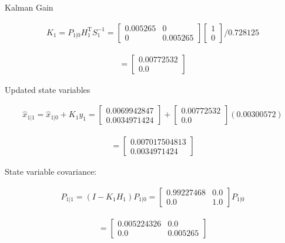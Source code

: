 Kalman Gain

\[\begin{aligned}
K_1 = P_{1|0}H_1^\text{T}S_1^{-1} = \begin{bmatrix} 0.005265&0\\0& 0.005265\end{bmatrix}
\begin{bmatrix} 1\\0\end{bmatrix}/0.728125
\end{aligned}\]

\[\begin{aligned}
= \begin{bmatrix} 0.00772532 \\ 0.0 \end{bmatrix}
\end{aligned}\]

Updated state variables

\[\begin{aligned}
\hat{x}_{1|1} =
  \hat{x}_{1|0} + K_1 y_1 = \begin{bmatrix} 0.0069942847\\  0.0034971424\end{bmatrix} + \begin{bmatrix} 0.00772532 \\ 0.0 \end{bmatrix} (0.00300572)
\end{aligned}\]

\[\begin{aligned}
= \begin{bmatrix} 0.007017504813\\  0.0034971424\end{bmatrix}
\end{aligned}\]

State variable covariance:

\[\begin{aligned}
P_{1|1} =
  (I - K_1 H_1) P_{1|0} =  \begin{bmatrix} 0.99227468 & 0.0 \\ 0.0 & 1.0 \end{bmatrix} P_{1|0}
\end{aligned}\]

\[\begin{aligned}
= \begin{bmatrix} 0.005224326  &  0.0 \\
0.0  &  0.005265 \end{bmatrix}
\end{aligned}\]

